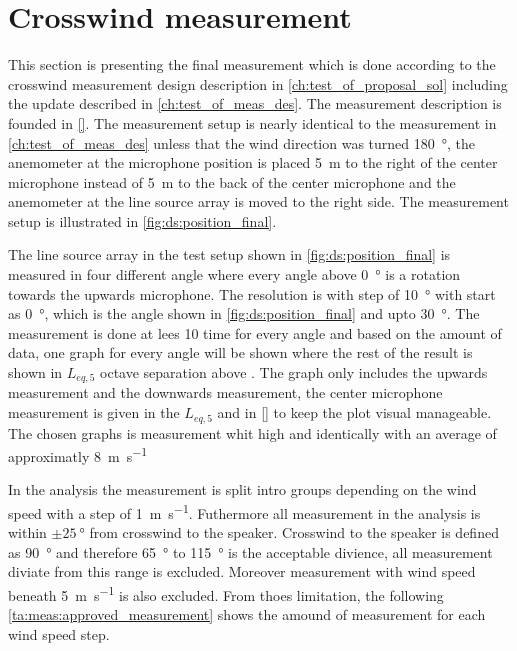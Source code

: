 \section{Crosswind measurement}\label{mes:kudo:cross_mes}
This section is presenting the final measurement which is done according to the crosswind measurement design description in \autoref{ch:test_of_proposal_sol} including the update described in \autoref{ch:test_of_meas_des}. The measurement description is founded in \autoref{}. The measurement setup is nearly identical to the measurement in \autoref{ch:test_of_meas_des} unless that the wind direction was turned \SI{180}{\degree}, the anemometer at the microphone position is placed \SI{5}{\meter} to the right of the center microphone instead of \SI{5}{\meter} to the back of the center microphone and the anemometer at the line source array is moved to the right side. The measurement setup is illustrated in \autoref{fig:ds:position_final}.



The line source array in the test setup shown in \autoref{fig:ds:position_final} is measured in four different angle where every angle above \SI{0}{\degree} is a rotation towards the upwards microphone. The resolution is with step of \SI{10}{\degree} with start as \SI{0}{\degree}, which is the angle shown in \autoref{fig:ds:position_final} and upto \SI{30}{\degree}. The measurement is done at lees 10 time for every angle and based on the amount of data, one graph for every angle will be shown where the rest of the result is shown in $L_{eq,5}$ octave separation above . The graph only includes the upwards measurement and the downwards measurement, the center microphone measurement is given in the $L_{eq,5}$ and in \autoref{} to keep the plot visual manageable. The chosen graphs is measurement whit high and identically with an average of approximatly \SI{8}{\meter\per\second}



In the analysis the measurement is split intro groups depending on the wind speed with a step of \SI{1}{\meter\per\second}. Futhermore all measurement in the analysis is within $\pm\SI{25}{\degree}$ from crosswind to the speaker. Crosswind to the speaker is defined as \SI{90}{\degree} and therefore \SI{65}{\degree} to \SI{115}{\degree} is the acceptable divience, all measurement diviate from this range is excluded. Moreover measurement with wind speed beneath \SI{5}{\meter\per\second} is also excluded. From thoes limitation, the following \autoref{ta:meas:approved_measurement} shows the amound of measurement for each wind speed step. 

